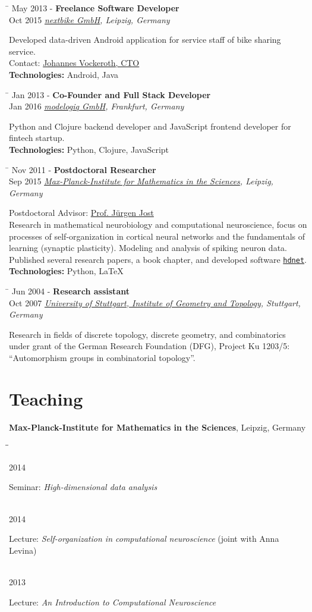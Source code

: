 \documentclass[10pt]{article} %
\newlength{\marginwidth}
\newlength{\smallertextwidth}
\newcommand{\job}[5]{
\begin{tabbing}
\hspace{\marginwidth} \= \kill
{#1} \> \textbf{#3}\\
{#2} \>\+ \textit{#4}\\[5pt]
\begin{minipage}{\smallertextwidth}
\vspace{5pt}
#5
\end{minipage}
\end{tabbing}
}
\newcommand{\tabbedblock}[1]{
\begin{tabbing}%
\hspace{\marginwidth}\=\hspace{\smallertextwidth}\=\kill%
#1%
\end{tabbing}
}
\newcommand{\tabitem}[2]{%
#1\>\begin{minipage}[t]{\smallertextwidth}#2\end{minipage}\\
}
\begin{document}
\job
{May 2013 -}{Oct 2015}
{Freelance Software Developer}
{\href{https://nextbike.com}{nextbike GmbH}\textup{, Leipzig, Germany}}
{
  Developed data-driven Android application for service staff of bike sharing service.\\
  Contact: \href{https://www.linkedin.com/in/johannes-vockeroth-8885709a/}{Johannes Vockeroth, CTO}\\[5pt]
  \textbf{Technologies:} Android, Java
}
  
\job
{Jan 2013 -}{Jan 2016}
{Co-Founder and Full Stack Developer}
{\href{https://www.modelogiq.com}{modelogiq GmbH}\textup{, Frankfurt, Germany}}
{
  Python and Clojure backend developer and JavaScript frontend developer for fintech startup.\\[5pt]
  \textbf{Technologies:} Python, Clojure, JavaScript
}

\job
{Nov 2011 -}{Sep 2015}
{Postdoctoral Researcher}
{\href{https://www.mis.mpg.de}{Max-Planck-Institute for Mathematics in the Sciences}\textup{, Leipzig, Germany}}
{
  Postdoctoral Advisor: \href{https://www.mis.mpg.de/de/jjost/juergen-jost.html}{Prof. Jürgen Jost}\\
  Research in mathematical neurobiology and computational neuroscience, focus on processes of self-organization
  in cortical neural networks and the fundamentals of learning (synaptic plasticity). Modeling and analysis
  of spiking neuron data. Published several research papers, a book chapter, and developed software
  \texttt{\href{https://github.com/team-hdnet/hdnet}{hdnet}}.\\[5pt]
  \textbf{Technologies:} Python, LaTeX
}

\job
{Jun 2004 -}{Oct 2007}
{Research assistant}
{\href{http://www.igt.uni-stuttgart.de}{University of Stuttgart, Institute of Geometry and Topology}\textup{, Stuttgart, Germany}}
{
  Research in fields of discrete topology, discrete geometry, and combinatorics under grant
  of the German Research Foundation (DFG), Project Ku 1203/5: ``Automorphism groups in combinatorial topology''.
}


\section{Teaching}

\textbf{Max-Planck-Institute for Mathematics in the Sciences}, Leipzig, Germany
%
\tabbedblock{
  \tabitem
  {2014}
  {Seminar: \textit{High-dimensional data analysis}}
  \tabitem
  {2014}
  {Lecture: \textit{Self-organization in computational neuroscience} (joint with Anna Levina)}
  \tabitem
  {2013}
  {Lecture: \textit{An Introduction to Computational Neuroscience}}
}
\end{document}
